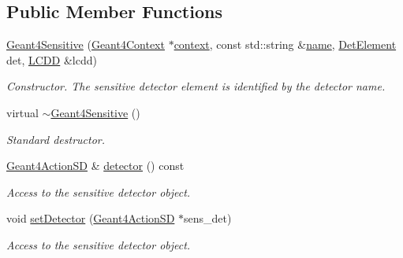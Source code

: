 \subsection*{Public Member Functions}
\begin{DoxyCompactItemize}
\item 
\hyperlink{class_d_d4hep_1_1_simulation_1_1_geant4_sensitive_a262aa19cea5ad71e75ff8250a55572f5}{Geant4\+Sensitive} (\hyperlink{class_d_d4hep_1_1_simulation_1_1_geant4_context}{Geant4\+Context} $\ast$\hyperlink{class_d_d4hep_1_1_simulation_1_1_geant4_action_aa9d87f0ec2a72b7fc2591b18f98d75cf}{context}, const std\+::string \&\hyperlink{class_d_d4hep_1_1_simulation_1_1_geant4_action_af374e70b014d16afb81dd9d77cc3894b}{name}, \hyperlink{class_d_d4hep_1_1_simulation_1_1_geant4_sensitive_a1cb1af5fb1194be1e1c1137f1e54272b}{Det\+Element} det, \hyperlink{class_d_d4hep_1_1_simulation_1_1_geant4_sensitive_a3373caa6917867ca7c871df20fb467c8}{L\+C\+DD} \&lcdd)
\begin{DoxyCompactList}\small\item\em Constructor. The sensitive detector element is identified by the detector name. \end{DoxyCompactList}\item 
virtual \hyperlink{class_d_d4hep_1_1_simulation_1_1_geant4_sensitive_ada2869ec6bcb9674eaa29f7e1c215729}{$\sim$\+Geant4\+Sensitive} ()
\begin{DoxyCompactList}\small\item\em Standard destructor. \end{DoxyCompactList}\item 
\hyperlink{class_d_d4hep_1_1_simulation_1_1_geant4_action_s_d}{Geant4\+Action\+SD} \& \hyperlink{class_d_d4hep_1_1_simulation_1_1_geant4_sensitive_aec1bfe9ac838d359d9e3948118b5c42d}{detector} () const
\begin{DoxyCompactList}\small\item\em Access to the sensitive detector object. \end{DoxyCompactList}\item 
void \hyperlink{class_d_d4hep_1_1_simulation_1_1_geant4_sensitive_aac4f3a911f3818516bfb54a5b2bbef39}{set\+Detector} (\hyperlink{class_d_d4hep_1_1_simulation_1_1_geant4_action_s_d}{Geant4\+Action\+SD} $\ast$sens\+\_\+det)
\begin{DoxyCompactList}\small\item\em Access to the sensitive detector object. \end{DoxyCompactList}\item 

\end{DoxyCompactItemize}
